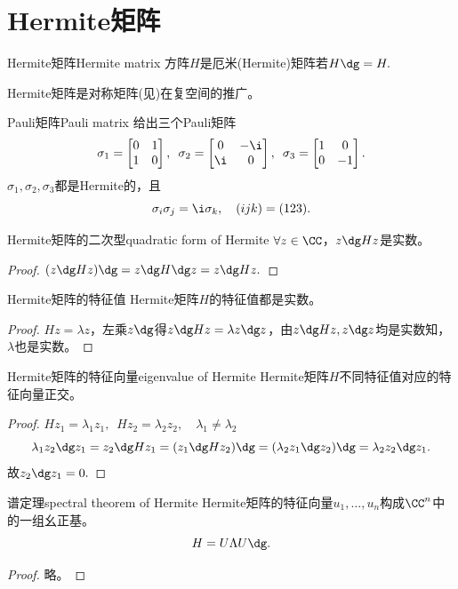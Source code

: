 \section{Hermite矩阵}

\begin{definition}{Hermite矩阵}{Hermite matrix}
	方阵$H$是厄米(Hermite)矩阵若$H\dg=H.$
\end{definition}
Hermite矩阵是对称矩阵(见)在复空间的推广。

\begin{example}{Pauli矩阵}{Pauli matrix}
	给出三个Pauli矩阵
	\[
		\sigma_1=
		\begin{bmatrix}
			0&1\\1&0
		\end{bmatrix},\enspace
		\sigma_2=
		\begin{bmatrix}
			0&-\i\\\i&0
		\end{bmatrix},\enspace
		\sigma_3=
		\begin{bmatrix}
			1&0\\0&-1
		\end{bmatrix}.
	\]
	$\sigma_1,\sigma_2,\sigma_3$都是Hermite的，且
	\[
		\sigma_i\sigma_j=\i\sigma_k,\quad(ijk)=(123).
	\]
\end{example}

\begin{theorem}{Hermite矩阵的二次型}{quadratic form of Hermite}
	$\forall z\in\CC$，$z\dg Hz$是实数。
\end{theorem}
\begin{proof}
	$(z\dg Hz)\dg=z\dg H\dg z=z\dg Hz.$
\end{proof}
\begin{theorem}{Hermite矩阵的特征值}{}
	Hermite矩阵$H$的特征值都是实数。
\end{theorem}
\begin{proof}
	$Hz=\lambda z$，左乘$z\dg$得$z\dg Hz=\lambda z\dg z$，由$z\dg Hz,z\dg z$均是实数知，$\lambda$也是实数。
\end{proof}
\begin{theorem}{Hermite矩阵的特征向量}{eigenvalue of Hermite}
	Hermite矩阵$H$不同特征值对应的特征向量正交。
\end{theorem}
\begin{proof}
	$Hz_1=\lambda_1z_1,\enspace Hz_2=\lambda_2z_2,\quad\lambda_1\neq\lambda_2$
	\[
		\lambda_1z_2\dg z_1=z_2\dg Hz_1=(z_1\dg Hz_2)\dg=(\lambda_2z_1\dg z_2)\dg=\lambda_2z_2\dg z_1.
	\]
	故$z_2\dg z_1=0.$
\end{proof}
\begin{theorem}{谱定理}{spectral theorem of Hermite}
	Hermite矩阵的特征向量$u_1,\ldots,u_n$构成$\CC^n$中的一组幺正基。
	\[
		H=U\Lambda U\dg.
	\]
\end{theorem}
\begin{proof}
	略。
\end{proof}
